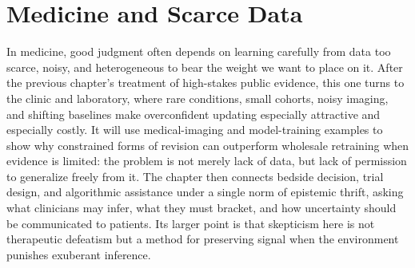 
\chapter{Medicine and Scarce Data}
\label{ch:ch086}

In medicine, good judgment often depends on learning carefully from data too scarce, noisy, and heterogeneous to bear the weight we want to place on it. After the previous chapter's treatment of high-stakes public evidence, this one turns to the clinic and laboratory, where rare conditions, small cohorts, noisy imaging, and shifting baselines make overconfident updating especially attractive and especially costly. It will use medical-imaging and model-training examples to show why constrained forms of revision can outperform wholesale retraining when evidence is limited: the problem is not merely lack of data, but lack of permission to generalize freely from it. The chapter then connects bedside decision, trial design, and algorithmic assistance under a single norm of epistemic thrift, asking what clinicians may infer, what they must bracket, and how uncertainty should be communicated to patients. Its larger point is that skepticism here is not therapeutic defeatism but a method for preserving signal when the environment punishes exuberant inference.
